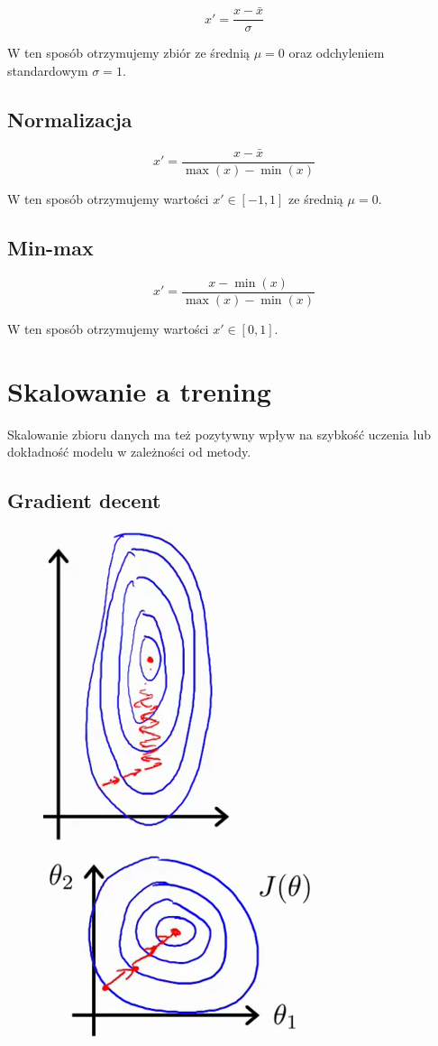 \documentclass{article}
\begin{document}
\[x' = \frac{x - \bar{x}}{\sigma}\]

W ten sposób otrzymujemy zbiór ze średnią $\mu = 0$ oraz odchyleniem standardowym $\sigma = 1$.

\subsection{Normalizacja}

\[x' = \frac{x - \bar{x}}{\max(x) - \min(x)}\]

W ten sposób otrzymujemy wartości $x' \in [-1,1]$ ze średnią $\mu = 0$.

\subsection{Min-max}

\[x' = \frac{x - \min(x)}{\max(x) - \min(x)}\]

W ten sposób otrzymujemy wartości $x' \in [0,1]$.

\section{Skalowanie a trening}

Skalowanie zbioru danych ma też pozytywny wpływ na szybkość uczenia lub dokładność modelu w zależności od metody.

\subsection{Gradient decent}

\begin{figure}[H]
    \centering
    \includegraphics[scale=0.4]{no_scaling.png}
    \includegraphics[scale=0.6]{yes_scaling.png}
\end{figure}
\end{document}
